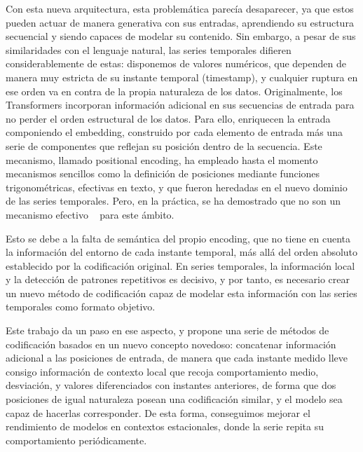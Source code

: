 Con esta nueva arquitectura, esta problemática parecía desaparecer, ya que estos pueden actuar de manera generativa con sus entradas, aprendiendo su estructura secuencial y siendo capaces de modelar su contenido. Sin embargo, a pesar de sus similaridades con el lenguaje natural, las series temporales difieren considerablemente de estas: disponemos de valores numéricos, que dependen de manera muy estricta de su instante temporal (timestamp), y cualquier ruptura en ese orden va en contra de la propia naturaleza de los datos.
Originalmente, los Transformers incorporan información adicional en sus secuencias de entrada para no perder el orden estructural de los datos. Para ello, enriquecen la entrada componiendo el embedding, construido por cada elemento de entrada más una serie de componentes que reflejan su posición dentro de la secuencia. Este mecanismo, llamado positional encoding, ha empleado hasta el momento mecanismos sencillos como la definición de posiciones mediante funciones trigonométricas, efectivas en texto, y que fueron heredadas en el nuevo dominio de las series temporales. Pero, en la práctica, se ha demostrado que no son un mecanismo efectivo ~\cite{zeng2022transformerseffectivetimeseries} para este ámbito.\vspace{0.35em}

Esto se debe a la falta de semántica del propio encoding, que no tiene en cuenta la información del entorno de cada instante temporal, más allá del orden absoluto establecido por la codificación original. En series temporales, la información local y la detección de patrones repetitivos es decisivo, y por tanto, es necesario crear un nuevo método de codificación capaz de modelar esta información con las series temporales como formato objetivo.\vspace{0.35em}

Este trabajo da un paso en ese aspecto, y propone una serie de métodos de codificación basados en un nuevo concepto novedoso: concatenar información adicional a las posiciones de entrada, de manera que cada instante medido lleve consigo información de contexto local que recoja comportamiento medio, desviación, y valores diferenciados con instantes anteriores, de forma que dos posiciones de igual naturaleza posean una codificación similar, y el modelo sea capaz de hacerlas corresponder. De esta forma, conseguimos mejorar el rendimiento de modelos en contextos estacionales, donde la serie repita su comportamiento periódicamente.\vspace{0.35em}

